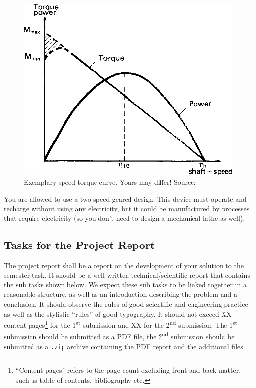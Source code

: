 \documentclass[headinclude=true]{scrartcl}
\begin{document}
\begin{figure} \centering
 \includegraphics[width=0.5\linewidth]{speed-torque}
 \caption{Exemplary speed-torque curve. Yours may differ! Source: \cite{Barber1997}}
\end{figure}


You are allowed to use a two-speed geared design. This device must operate and recharge without using any electricity, but it could be manufactured by processes that require electricity (so you don't need to design a mechanical lathe as well).

\subsection{Tasks for the Project Report}

The project report shall be a report on the development of your solution to the semester task. It should be a well-written technical/scientific report that contains the sub tasks shown below. We expect these sub tasks to be linked together in a reasonable structure, as well as an introduction describing the problem and a conclusion. It should observe the rules of good scientific and engineering practice as well as the stylistic ``rules'' of good typography. It should not exceed XX content pages\footnote{``Content pages'' refers to the page count excluding front and back matter, such as table of contents, bibliography etc.} for the 1\textsuperscript{st} submission and XX for the 2\textsuperscript{nd} submission. The 1\textsuperscript{st} submission should be submitted as a PDF file, the 2\textsuperscript{nd} submission should be submitted as a \texttt{.zip} archive containing the PDF report and the additional files.
\end{document}
